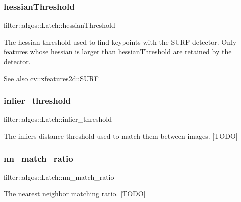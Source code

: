 \subsubsection{\texorpdfstring{hessian\+Threshold}{hessianThreshold}}
{\footnotesize\ttfamily filter\+::algos\+::\+Latch\+::hessian\+Threshold}

The hessian threshold used to find keypoints with the S\+U\+RF detector. Only features whose hessian is larger than hessian\+Threshold are retained by the detector. \begin{DoxySeeAlso}{See also}
cv\+::xfeatures2d\+::\+S\+U\+RF 
\end{DoxySeeAlso}
\mbox{\label{classfilter_1_1algos_1_1_latch_aab05d5914e2196fc6847d42a6843a9e7}} 
\subsubsection{\texorpdfstring{inlier\+\_\+threshold}{inlier\_threshold}}
{\footnotesize\ttfamily filter\+::algos\+::\+Latch\+::inlier\+\_\+threshold}

The inliers distance threshold used to match them between images. \mbox{[}T\+O\+DO\mbox{]} \mbox{\label{classfilter_1_1algos_1_1_latch_a3cec94cb16dd56db4f06d29c904939c3}} 
\subsubsection{\texorpdfstring{nn\+\_\+match\+\_\+ratio}{nn\_match\_ratio}}
{\footnotesize\ttfamily filter\+::algos\+::\+Latch\+::nn\+\_\+match\+\_\+ratio}

The nearest neighbor matching ratio. \mbox{[}T\+O\+DO\mbox{]} \mbox{\label{classfilter_1_1algos_1_1_latch_a41f85dfe09e4566d5a572682abdd7595}} 

